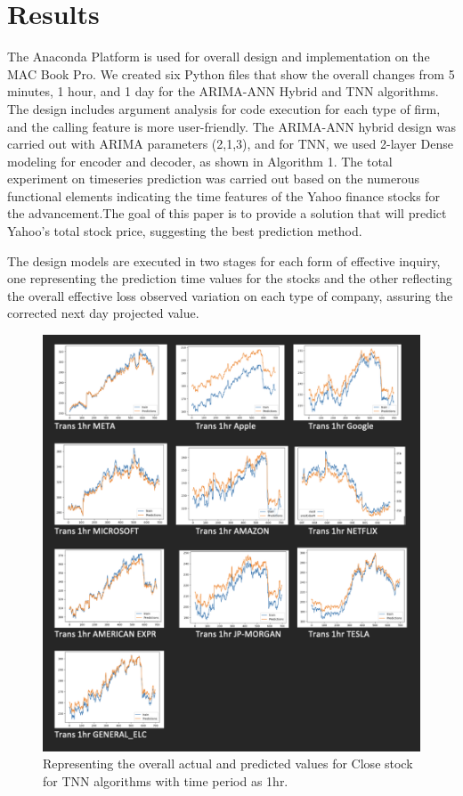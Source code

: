 \chapter{Results}
\label{ch:results}

The Anaconda Platform is used for overall design and implementation on the MAC Book Pro. We created six Python files that show the overall changes from 5 minutes, 1 hour, and 1 day for the ARIMA-ANN Hybrid and TNN algorithms. The design includes argument analysis for code execution for each type of firm, and the calling feature is more user-friendly. The ARIMA-ANN hybrid design was carried out with ARIMA parameters (2,1,3), and for TNN, we used 2-layer Dense modeling for encoder and decoder, as shown in Algorithm 1. The total experiment on timeseries prediction was carried out based on the numerous functional elements indicating the time features of the Yahoo finance stocks for the advancement.The goal of this paper is to provide a solution that will predict Yahoo's total stock price, suggesting the best prediction method.

The design models are executed in two stages for each form of effective inquiry, one representing the prediction time values for the stocks and the other reflecting the overall effective loss observed variation on each type of company, assuring the corrected next day projected value.

\begin{figure}[ht]
    \centering
    \includegraphics[scale=0.4]{figures/Trans 1hr.png}
    \caption{Representing the overall actual and predicted values for Close stock for TNN algorithms with time period as 1hr.}
    \label{fig:chart_a}
\end{figure}
 
